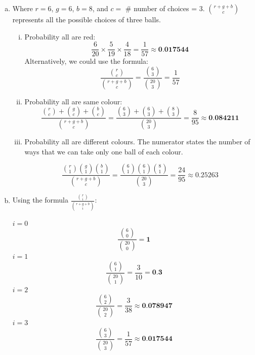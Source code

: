 \documentclass[11pt]{extarticle}
\begin{document}
\begin{enumerate}[(a)]

\item Where $r=6$, $g=6$, $b=8$, and $c=$ \# number of choices = 3. ${r+g+b \choose c}$ represents all the possible choices of three balls. 

 \begin{enumerate}[(i)]
\item Probability all are red: $$ \frac{6}{20} \times  \frac{5}{19} \times  \frac{4}{18} = \frac{1}{57} \approx \textbf{0.017544}$$
Alternatively, we could use the formula:
 $$\frac{{r \choose c}}{{r + g + b \choose c}} = \frac{{6 \choose 3}}{{20 \choose 3}} = \frac{1}{57}$$
\item Probability all are same colour:  $$\frac{{r \choose c} + {g \choose c} + {b \choose c}}{{r + g + b \choose c}} = \frac{{6 \choose 3} + {6 \choose 3} + {8 \choose 3}}{{20 \choose 3}} = \frac{8}{95} \approx \textbf{0.084211}$$
\item Probability all are different colours. The numerator states the number of ways that we can take only one ball of each colour.

$$\frac{{r \choose 1}{g \choose 1}{b \choose 1}}{{r + g + b \choose c}} = \frac{{6 \choose 1}{6 \choose 1}{8 \choose 1}}{{20 \choose 3}} = \frac{24}{95} \approx \mathbf{0.25263}$$ 
\end{enumerate}

\item Using the formula $\frac{{r \choose i}}{{r + g + b \choose i}}$:

$i=0$ 
$$ \frac{{6 \choose 0}}{{20 \choose 0}} = \textbf{1} $$
$i=1$ 
$$ \frac{{6 \choose 1}}{{20 \choose 1}} = \frac{3}{10} = \textbf{0.3} $$
$i=2$ 
$$ \frac{{6 \choose 2}}{{20 \choose 2}} = \frac{3}{38} \approx \textbf{0.078947} $$
$i=3$ 
$$ \frac{{6 \choose 3}}{{20 \choose 3}} = \frac{1}{57} \approx \textbf{0.017544} $$

\end{enumerate}
\end{document}
